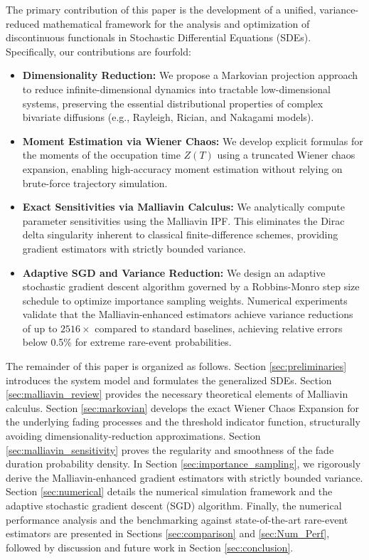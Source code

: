 \documentclass[11pt]{article}
\begin{document}
The primary contribution of this paper is the development of a unified, variance-reduced mathematical framework for the analysis and optimization of discontinuous functionals in Stochastic Differential Equations (SDEs). Specifically, our contributions are fourfold:
\begin{itemize}
    \item \textbf{Dimensionality Reduction:} We propose a Markovian projection approach to reduce infinite-dimensional dynamics into tractable low-dimensional systems, preserving the essential distributional properties of complex bivariate diffusions (e.g., Rayleigh, Rician, and Nakagami models).
    \item \textbf{Moment Estimation via Wiener Chaos:} We develop explicit formulas for the moments of the occupation time $Z(T)$ using a truncated Wiener chaos expansion, enabling high-accuracy moment estimation without relying on brute-force trajectory simulation.
    \item \textbf{Exact Sensitivities via Malliavin Calculus:} We analytically compute parameter sensitivities using the Malliavin IPF. This eliminates the Dirac delta singularity inherent to classical finite-difference schemes, providing gradient estimators with strictly bounded variance.
    \item \textbf{Adaptive SGD and Variance Reduction:} We design an adaptive stochastic gradient descent algorithm governed by a Robbins-Monro step size schedule to optimize importance sampling weights. Numerical experiments validate that the Malliavin-enhanced estimators achieve variance reductions of up to $2516 \times$ compared to standard baselines, achieving relative errors below 0.5\% for extreme rare-event probabilities.
\end{itemize}

The remainder of this paper is organized as follows. Section \ref{sec:preliminaries} introduces the system model and formulates the generalized SDEs. Section \ref{sec:malliavin_review} provides the necessary theoretical elements of Malliavin calculus. Section \ref{sec:markovian} develops the exact Wiener Chaos Expansion for the underlying fading processes and the threshold indicator function, structurally avoiding dimensionality-reduction approximations. Section \ref{sec:malliavin_sensitivity} proves the regularity and smoothness of the fade duration probability density. In Section \ref{sec:importance_sampling}, we rigorously derive the Malliavin-enhanced gradient estimators with strictly bounded variance. Section \ref{sec:numerical} details the numerical simulation framework and the adaptive stochastic gradient descent (SGD) algorithm. Finally, the numerical performance analysis and the benchmarking against state-of-the-art rare-event estimators are presented in Sections \ref{sec:comparison} and \ref{sec:Num_Perf}, followed by discussion and future work in Section \ref{sec:conclusion}.
\end{document}
